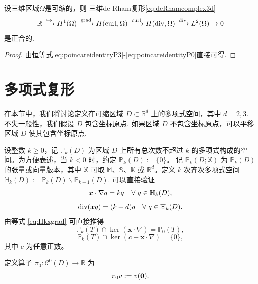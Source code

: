 \begin{theorem}
设三维区域$\Omega$是可缩的，则
三维de Rham复形\eqref{eq:deRhamcomplex3d}
\begin{equation*}
\mathbb R\xrightarrow{\hookrightarrow} H^1(\Omega)\xrightarrow{\operatorname{grad}} H(\operatorname{curl}, \Omega)\xrightarrow{\operatorname{curl}} H(\operatorname{div}, \Omega) \xrightarrow{\operatorname{div}} L^2(\Omega)\xrightarrow{}0
\end{equation*}
是正合的.
\end{theorem}
\begin{proof}
由恒等式\eqref{eq:poincareidentityP3}-\eqref{eq:poincareidentityP0}直接可得.
\end{proof}



\section{多项式复形}

在本节中，我们将讨论定义在可缩区域 $D\subset\mathbb R^d$ 上的多项式空间，其中 $d=2,3$. 不失一般性，我们假设 $D$ 包含坐标原点. 如果区域 $D$ 不包含坐标原点，可以平移区域 $D$ 使其包含坐标原点. 


设整数 $k\geq0$，记 $\mathbb P_k(D)$ 为区域 $D$ 上所有总次数不超过 $k$ 的多项式构成的空间。为方便表述，当 $k<0$ 时，约定 $\mathbb P_k(D):=\{0\}$。
记 $\mathbb P_k(D; \mathbb{X})$ 为 $\mathbb P_k(D)$ 的张量或向量版本，其中 $\mathbb{X}$ 可取 $\mathbb M$、$\mathbb{S}$、$\mathbb{K}$ 或 $\mathbb{R}^d$。定义 $k$ 次齐次多项式空间 $\mathbb H_k(D):=\mathbb P_k(D)\backslash \mathbb P_{k-1}(D)$. 
可以直接验证
\begin{equation}\label{eq:Hkxgrad}
\boldsymbol x\cdot\nabla q=kq\quad\forall~q\in\mathbb H_k(D),
\end{equation}
\begin{equation}\label{eq:Hkdiv}
\operatorname{div}(\boldsymbol x q)=(k+d)q\quad\forall~q\in\mathbb H_k(D).
\end{equation}
由等式 \eqref{eq:Hkxgrad} 可直接推得
\cite[(35)]{ChenHuang2022a}
$$
\mathbb P_{k}(T)\cap\ker(\boldsymbol{x}\cdot\nabla)=\mathbb P_{0}(T),
$$
\begin{equation}\label{eq:20230205}
\mathbb P_{k}(T)\cap\ker(c+\boldsymbol{x}\cdot\nabla)=\{0\},
\end{equation}
其中 $c$ 为任意正数。


定义算子 $\pi_{0}: \mathcal C^0(D)\to \mathbb R$ 为
\[
\pi_{0}v:=v(\boldsymbol0).
\]






